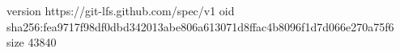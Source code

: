 version https://git-lfs.github.com/spec/v1
oid sha256:fea9717f98df0dbd342013abe806a613071d8ffac4b8096f1d7d066e270a75f6
size 43840
